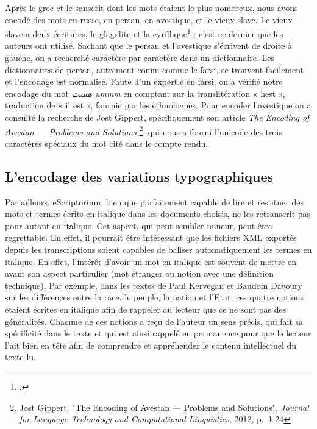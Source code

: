 \documentclass{article}
\begin{document}
	Après le grec et le sanscrit dont les mots étaient le plus nombreux, nous avons encodé des mots en russe, en persan, en avestique, et le vieux-slave. Le vieux-slave a deux écritures, le glagolite et la cyrillique\footcite{vaillantAlphabetVieuxslave1955} ; c'est ce dernier que les auteurs ont utilisé. Sachant que le persan et l’avestique s’écrivent de droite à gauche, on a recherché caractère par caractère dans un dictionnaire. Les dictionnaires de persan, autrement connu comme le farsi, se trouvent facilement et l’encodage est normalisé. Faute d’un expert.e en farsi, on a vérifié notre encodage du mot \textit{ هست \underline{ummm} } en comptant sur la translitération « hest », traduction de « il est », fournie par les ethnologues. Pour encoder l’avestique on a consulté la recherche de Jost Gippert, spécifiquement son article \textit{The Encoding of Avestan — Problems and Solutions} \footnote{Jost Gippert, "The Encoding of Avestan — Problems and Solutions", \textit{Journal for Language Technology and Computational Linguistics}, 2012, p.~1-24}, qui nous a fourni l’unicode des trois caractères spéciaux du mot cité dans le compte rendu.
	
	
	\subsection{L'encodage des variations typographiques}
	
	Par ailleurs, eScriptorium, bien que parfaitement capable de lire et restituer des mots et termes écrits en italique dans les documents choisis, ne les retranscrit pas pour autant en italique. Cet aspect, qui peut sembler mineur, peut être regrettable. En effet, il pourrait être intéressant que les fichiers XML exportés depuis les transcriptions soient capables de baliser automatiquement les termes en italique. En effet, l'intêrêt d'avoir un mot en italique est souvent de mettre en avant son aspect particulier (mot étranger ou notion avec une définition technique). Par exemple, dans les textes de Paul Kervegan et Baudoin Davoury sur les différences entre la race, le peuple, la nation et l'Etat, ces quatre notions étaient écrites en italique afin de rappeler au lecteur que ce ne sont pas des généralités. Chacune de ces notions a reçu de l'auteur un sens précis, qui fait sa spécificité dans le texte et qui est ainsi rappelé en permanence pour que le lecteur l'ait bien en tête afin de comprendre et appréhender le contenu intellectuel du texte lu.
	
	\pagebreak
	\printbibliography[title=Bibliographie]
	
	\pagebreak
	\tableofcontents
\end{document}
